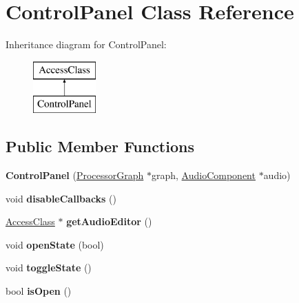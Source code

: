 \hypertarget{classControlPanel}{\section{Control\-Panel Class Reference}
\label{classControlPanel}
}
Inheritance diagram for Control\-Panel\-:\begin{figure}[H]
\begin{center}
\leavevmode
\includegraphics[height=2.000000cm]{classControlPanel}
\end{center}
\end{figure}
\subsection*{Public Member Functions}
\begin{DoxyCompactItemize}
\item 
\hypertarget{classControlPanel_a3d1860dbaa23c7c0b98b9f8caddaeef3}{{\bfseries Control\-Panel} (\hyperlink{classProcessorGraph}{Processor\-Graph} $\ast$graph, \hyperlink{classAudioComponent}{Audio\-Component} $\ast$audio)}\label{classControlPanel_a3d1860dbaa23c7c0b98b9f8caddaeef3}

\item 
\hypertarget{classControlPanel_a0e95cce1ecb861a21ae5aeb07a5c8820}{void {\bfseries disable\-Callbacks} ()}\label{classControlPanel_a0e95cce1ecb861a21ae5aeb07a5c8820}

\item 
\hypertarget{classControlPanel_a180e7c402f30514d8e4667afb61d5647}{\hyperlink{classAccessClass}{Access\-Class} $\ast$ {\bfseries get\-Audio\-Editor} ()}\label{classControlPanel_a180e7c402f30514d8e4667afb61d5647}

\item 
\hypertarget{classControlPanel_a79310ce5e86258dd74d4afcdb624a0ec}{void {\bfseries open\-State} (bool)}\label{classControlPanel_a79310ce5e86258dd74d4afcdb624a0ec}

\item 
\hypertarget{classControlPanel_a40df9a6291f6f8325db76e51cda37d63}{void {\bfseries toggle\-State} ()}\label{classControlPanel_a40df9a6291f6f8325db76e51cda37d63}

\item 
\hypertarget{classControlPanel_af5834f9032f88c6578b557cbd9e5f5eb}{bool {\bfseries is\-Open} ()}\label{classControlPanel_af5834f9032f88c6578b557cbd9e5f5eb}

\end{DoxyCompactItemize}
